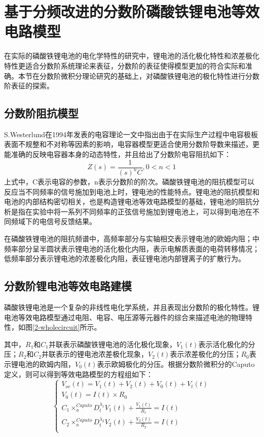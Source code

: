 \section{基于分频改进的分数阶磷酸铁锂电池等效电路模型}
在实际的磷酸铁锂电池的电化学特性的研究中，锂电池的活化极化特性和浓差极化特性更适合分数阶系统理论来表征，分数阶的表征使得模型更加的符合实际和准确。本节在分数阶微积分理论研究的基础上，对磷酸铁锂电池的极化特性进行分数阶表征的探索。
\subsection{分数阶阻抗模型}
S.Westerlund在1994年发表的电容理论一文中指出由于在实际生产过程中电容极板表面不规整和不对称等因素的影响，电容器模型更适合使用分数阶导数来描述，更能准确的反映电容器本身的动态特性，并且给出了分数阶电容阻抗如下：
\begin{equation}
Z\left( s \right)=\frac{1}{{{\left( s \right)}^{n}}C},0<n<1
\end{equation}
上式中，C表示电容的参数，n表示分数阶的阶次。磷酸铁锂电池的阻抗模型可以反应当不同频率的信号施加到电池上时，锂电池的性能特点。锂电池的阻抗模型和电池的内部结构密切相关，也是构造锂电池等效电路模型的基础，锂电池的阻抗分析是指在实验中将一系列不同频率的正弦信号施加到锂电池上，可以得到电池在不同频域下的电信号反馈结果。

在磷酸铁锂电池的阻抗频谱中，高频率部分与实轴相交表示锂电池的欧姆内阻；中频率部分呈半圆状表示锂电池的活化极化内阻，表示电解质表面的电荷转移情况；低频率部分表示锂电池的浓差极化内阻，表征锂电池内部锂离子的扩散行为。
\subsection{分数阶锂电池等效电路建模}
磷酸铁锂电池是一个复杂的非线性电化学系统，并且表现出分数阶的极化特性。锂电池等效电路模型通过电阻、电容、电压源等元器件的综合来描述电池的物理特性，如图\ref{2-wholecircuit}所示。

其中，${{R}_{1}}$和${{C}_{1}}$并联表示磷酸铁锂电池的活化极化现象，${{V}_{1}}(t)$表示活化极化的分压；${{R}_{2}}$和${{C}_{2}}$并联表示的锂电池浓差极化现象，${{V}_{2}}(t)$表示浓差极化的分压；${{R}_{0}}$表示锂电池的欧姆内阻，${{V}_{0}}(t)$表示欧姆极化的分压。根据分数阶微积分的Caputo定义，则可以得到等效电路模型的方程组如下：
\begin{equation}
\left\{ \begin{array}{l}
   {{V}_{oc}}(t)={{V}_{1}}(t)+{{V}_{2}}(t)+{{V}_{0}}(t)+{{V}_{t}}(t) \\ 
  {{V}_{0}}(t)=I(t)\times {{R}_{0}} \\ 
  {{C}_{1}}\times _{a}^{Caputo}D_{t}^{{{\lambda }_{1}}}{{V}_{1}}(t)+\frac{{{V}_{1}}(t)}{{{R}_{1}}}=I(t) \\ 
  {{C}_{2}}\times _{a}^{Caputo}D_{t}^{{{\lambda }_{2}}}{{V}_{2}}(t)+\frac{{{V}_{2}}(t)}{{{R}_{2}}}=I(t) \\ 
 \end{array} \right.
\end{equation}


